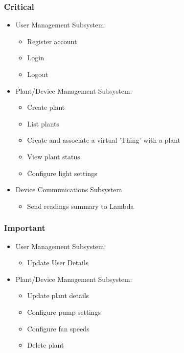 \documentclass{article}
\begin{document}
\subsubsection{Critical}
\begin{itemize}
	\item User Management Subsystem:
	\begin{itemize}
		\item Register account
		\item Login
		\item Logout
	\end{itemize}
	
	\item Plant/Device Management Subsystem:
	\begin{itemize}
		\item Create plant
		\item List plants
		\item Create and associate a virtual 'Thing' with a plant
		\item View plant status
		\item Configure light settings
	\end{itemize}
	
	\item Device Communications Subsystem
	\begin{itemize}
		\item Send readings summary to Lambda
	\end{itemize}
\end{itemize}

\subsubsection{Important}
\begin{itemize}
	\item User Management Subsystem:
	\begin{itemize}
		\item Update User Details
	\end{itemize}
	
	\item Plant/Device Management Subsystem:
	\begin{itemize}
		\item Update plant details
		\item Configure pump settings
		\item Configure fan speeds
		\item Delete plant
	\end{itemize}
\end{itemize}
\end{document}
